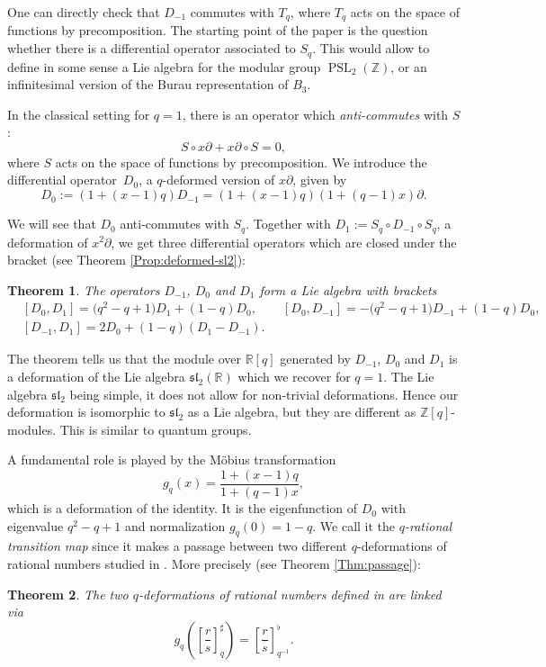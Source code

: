 \documentclass[pdftex]{sigma}
\numberwithin{equation}{section}
\newtheorem{Theorem}{Theorem}[section]
\newcommand*{\R}{\mathbb{R}}
\newcommand*{\Z}{\mathbb{Z}}
\DeclareMathOperator{\PSL}{PSL}
\begin{document}
One can directly check that $D_{-1}$ commutes with $T_q$, where $T_q$ acts on the space of functions by precomposition.
The starting point of the paper is the question whether there is a differential operator associated to $S_q$. This would allow to define in some sense a Lie algebra for the modular group $\PSL_2(\Z)$, or an infinitesimal version of the Burau representation of $B_3$.


In the classical setting for $q=1$, there is an operator which \emph{anti-commutes} with $S$:
\[
S\circ x\partial+x\partial\circ S = 0,
\]
where $S$ acts on the space of functions by precomposition.
We introduce the differential operator~$D_0$, a $q$-deformed version of $x\partial$, given by
\[D_0:=(1+(x-1)q)D_{-1}=(1+(x-1)q)(1+(q-1)x)\partial.
\]

We will see that $D_0$ anti-commutes with $S_q$. Together with $D_1:=S_q\circ D_{-1}\circ S_q$, a deformation of $x^2\partial$, we get three differential operators which are closed under the bracket (see Theorem \ref{Prop:deformed-sl2}):
\begin{Theorem}
The operators $D_{-1}$, $D_0$ and $D_1$ form a Lie algebra with brackets
\begin{align*}
&[D_0,D_1]= \big(q^2-q+1\big)D_1+(1-q)D_0, \qquad
[D_0,D_{-1}] = -\big(q^2-q+1\big)D_{-1}+(1-q)D_0, \\
&[D_{-1},D_1]= 2D_0+(1-q)(D_{1}-D_{-1}).
\end{align*}
\end{Theorem}
The theorem tells us that the module over $\R[q]$ generated by $D_{-1}$, $D_0$ and $D_1$ is a deformation of the Lie algebra $\mathfrak{sl}_2(\R)$ which we recover for $q=1$. The Lie algebra $\mathfrak{sl}_2$ being simple, it does not allow for non-trivial deformations. Hence our deformation is isomorphic to $\mathfrak{sl}_2$ as a Lie algebra, but they are different as $\mathbb{Z}[q]$-modules. This is similar to quantum groups.

A fundamental role is played by the M\"obius transformation
\[
g_q(x)=\frac{1+(x-1)q}{1+(q-1)x},
\]
which is a deformation of the identity. It is the eigenfunction of $D_0$ with eigenvalue $q^2-q+1$ and normalization $g_q(0)=1-q$.
We call it the \emph{$q$-rational transition map} since it makes a passage between two different $q$-deformations of rational numbers studied in \cite{bapat2023q}. More precisely (see Theorem \ref{Thm:passage}):
\begin{Theorem}
The two $q$-deformations of rational numbers defined in {\rm \cite[Definition 2.6]{bapat2023q}} are linked via
\[
g_q\left(\left[\frac{r}{s}\right]_q^\sharp\right)=\left[\frac{r}{s}\right]_{q^{-1}}^\flat.\]
\end{Theorem}
\end{document}
